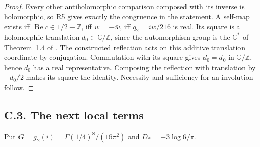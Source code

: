 \begin{proof}
Every other antiholomorphic comparison composed with its inverse is
holomorphic, so R5 gives exactly the congruence in the statement.
A self-map exists iff $\operatorname{Re}c\in1/2+\mathbb Z$, iff
$w=-\bar w$, iff $q_2=iw/216$ is real. Its square is a holomorphic
translation $d_0\in\mathbb C/\mathbb Z$, since the automorphism group
is the $\mathbb C^*$ of Theorem~1.4 of
\cite{DuGuoKusakabeXie2026v1}. The constructed reflection acts on
this additive translation coordinate by conjugation. Commutation
with its square gives $d_0=\bar d_0$ in $\mathbb C/\mathbb Z$, hence
$d_0$ has a real representative. Composing the reflection with
translation by $-d_0/2$ makes its square the identity. Necessity and
sufficiency for an involution follow.
\end{proof}

\subsection{C.3. The next local terms}
Put $G=g_2(i)=\Gamma(1/4)^8/(16\pi^2)$ and
$D_*=-3\log6/\pi$.

